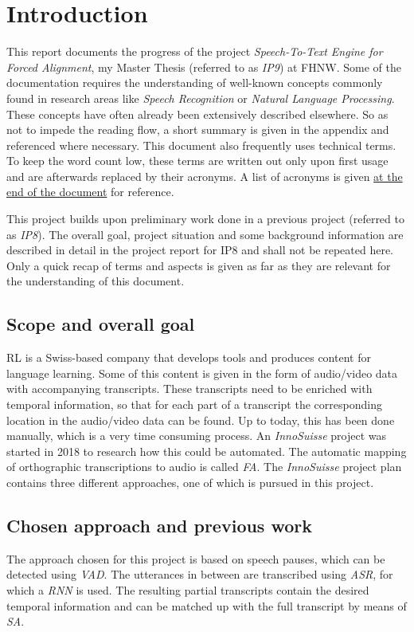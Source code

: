 \section{Introduction}\label{intro}
This report documents the progress of the project \textit{Speech-To-Text Engine for Forced Alignment}, my Master Thesis (referred to as \textit{IP9}) at \ac{FHNW}. Some of the documentation requires the understanding of well-known concepts commonly found in research areas like \textit{Speech Recognition} or \textit{Natural Language Processing}. These concepts have often already been extensively described elsewhere. So as not to impede the reading flow, a short summary is given in the appendix and referenced where necessary. This document also frequently uses technical terms. To keep the word count low, these terms are written out only upon first usage and are afterwards replaced by their acronyms. A list of acronyms is given \hyperref[acronyms]{at the end of the document} for reference.

This project builds upon preliminary work done in a previous project (referred to as \textit{IP8}). The overall goal, project situation and some background information are described in detail in the project report for IP8 and shall not be repeated here. Only a quick recap of terms and aspects is given as far as they are relevant for the understanding of this document.

\subsection{Scope and overall goal}
\ac{RL} is a Swiss-based company that develops tools and produces content for language learning. Some of this content is given in the form of audio/video data with accompanying transcripts. These transcripts need to be enriched with temporal information, so that for each part of a transcript the corresponding location in the audio/video data can be found. Up to today, this has been done manually, which is a very time consuming process. An \textit{InnoSuisse} project was started in 2018 to research how this could be automated. The automatic mapping of orthographic transcriptions to audio is called \textit{\ac{FA}}. The \textit{InnoSuisse} project plan contains three different approaches, one of which is pursued in this project.

\subsection{Chosen approach and previous work}
The approach chosen for this project is based on speech pauses, which can be detected using \textit{\ac{VAD}}. The utterances in between are transcribed using \textit{\ac{ASR}}, for which a \textit{\ac{RNN}} is used. The resulting partial transcripts contain the desired temporal information and can be matched up with the full transcript by means of \textit{\ac{SA}}.

